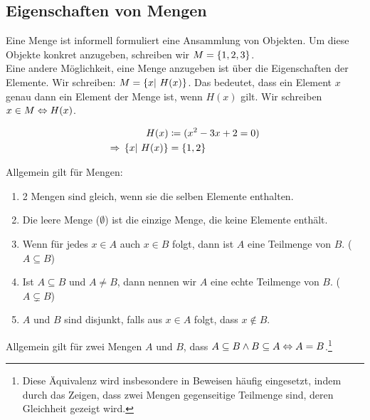 \thispagestyle{pagenumberonly}

\subsection{Eigenschaften von Mengen}

\begin{notation}
    Eine Menge ist informell formuliert eine Ansammlung von Objekten.
    Um diese Objekte konkret anzugeben, schreiben wir $M = \left\{1, 2, 3\right\}$.\\
    Eine andere Möglichkeit, eine Menge anzugeben ist über die Eigenschaften der Elemente.
    Wir schreiben: $M=\left\{x|~H(x)\right\}$. Das bedeutet, dass ein Element $x$ genau dann ein Element der Menge ist, wenn $H(x)$ gilt.
    Wir schreiben $x\in M \Leftrightarrow{} H(x)$.
\end{notation}

\begin{beispiel}
    \begin{align*}
        H(x) &\coloneqq (x^2-3x+2 = 0)\\
        \Rightarrow{} \left\{x|~H(x)\right\} &= \left\{1,2\right\}
    \end{align*}
\end{beispiel}

\begin{definition}
    Allgemein gilt für Mengen:
    \theoremescape
    \begin{enumerate}
        \item 2 Mengen sind gleich, wenn sie die selben Elemente enthalten.
        \item Die leere Menge ($\emptyset$) ist die einzige Menge, die keine Elemente enthält.
        \item Wenn für jedes $x\in A$ auch $x\in B$ folgt, dann ist $A$ eine Teilmenge von $B$. ($A\subseteq B$)
        \item Ist $A\subseteq B$ und $A\neq B$, dann nennen wir $A$ eine echte Teilmenge von $B$. ($A\subsetneq B$)
        \item $A$ und $B$ sind disjunkt, falls aus $x\in A$ folgt, dass $x\not\in B$.
    \end{enumerate}
\end{definition}

\begin{bemerkung}
    Allgemein gilt für zwei Mengen $A$ und $B$, dass $A\subseteq B \land B\subseteq A \Leftrightarrow{} A = B$.\footnote{Diese Äquivalenz wird insbesondere in Beweisen häufig eingesetzt, indem durch das Zeigen, dass zwei Mengen gegenseitige Teilmenge sind, deren Gleichheit gezeigt wird.}
\end{bemerkung}

